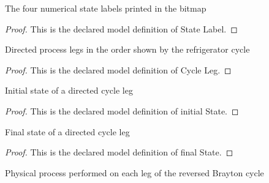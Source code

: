 \begin{definition}
  \label{def:physics:phyx-mini-0481:phyxminiproblems-problemphyxmini0481-statelabel}
  The four numerical state labels printed in the bitmap
\end{definition}
\begin{proof}
  This is the declared model definition of State Label.
\end{proof}
\begin{definition}
  \label{def:physics:phyx-mini-0481:phyxminiproblems-problemphyxmini0481-cycleleg}
  Directed process legs in the order shown by the refrigerator cycle
\end{definition}
\begin{proof}
  This is the declared model definition of Cycle Leg.
\end{proof}
\begin{definition}
  \label{def:physics:phyx-mini-0481:phyxminiproblems-problemphyxmini0481-cycleleg-initialstate}
  Initial state of a directed cycle leg
\end{definition}
\begin{proof}
  This is the declared model definition of initial State.
\end{proof}
\begin{definition}
  \label{def:physics:phyx-mini-0481:phyxminiproblems-problemphyxmini0481-cycleleg-finalstate}
  Final state of a directed cycle leg
\end{definition}
\begin{proof}
  This is the declared model definition of final State.
\end{proof}
\begin{definition}
  \label{def:physics:phyx-mini-0481:phyxminiproblems-problemphyxmini0481-processkind}
  Physical process performed on each leg of the reversed Brayton cycle
\end{definition}
